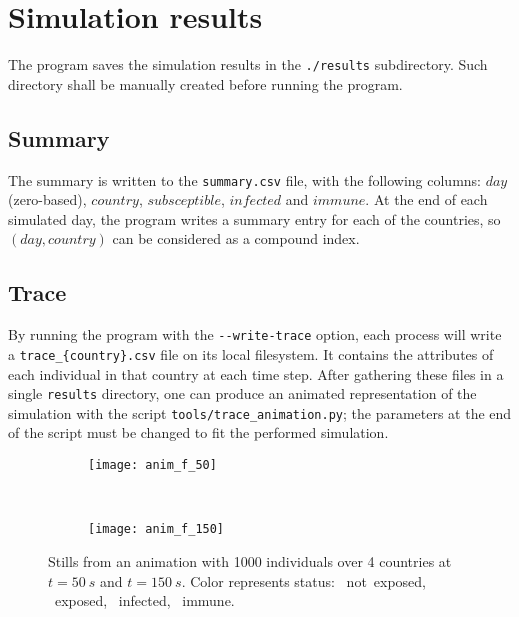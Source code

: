 \section{Simulation results}
\label{sec:sim_res}

The program saves the simulation results in the \texttt{./results} subdirectory. Such directory shall be manually created before running the program.

\subsection{Summary}
The summary is written to the \texttt{summary.csv} file, with the following columns: $day$ (zero-based), $country$, $subsceptible$, $infected$ and $immune$.
At the end of each simulated day, the program writes a summary entry for each of the countries, so $(day, country)$ can be considered as a compound index.

\subsection{Trace}
By running the program with the \verb!--write-trace! option, each process will write a \texttt{trace\_\{country\}.csv} file on its local filesystem. It contains the attributes of each individual in that country at each time step.
After gathering these files in a single \texttt{results} directory, one can produce an animated representation of the simulation with the script \texttt{tools/trace\_animation.py}; the parameters at the end of the script must be changed to fit the performed simulation.

\begin{figure}[hb]
    \begin{subfigure}[c]{0.49\textwidth}
        \texttt{[image: anim\_f\_50]}
    \end{subfigure}
    ~
    \begin{subfigure}[c]{0.49\textwidth}
        \texttt{[image: anim\_f\_150]}
    \end{subfigure}
    \caption{Stills from an animation with 1000 individuals over 4 countries at $t=\SI{50}{s}$ and $t=\SI{150}{s}$. Color represents status:
    \textcolor{plt:green}{\circmark}~not~exposed,
    \textcolor{plt:yellow}{\circmark}~exposed,
    \textcolor{plt:red}{\circmark}~infected,
    \textcolor{plt:blue}{\circmark}~immune.
    }
    \label{fig:animation}
\end{figure}